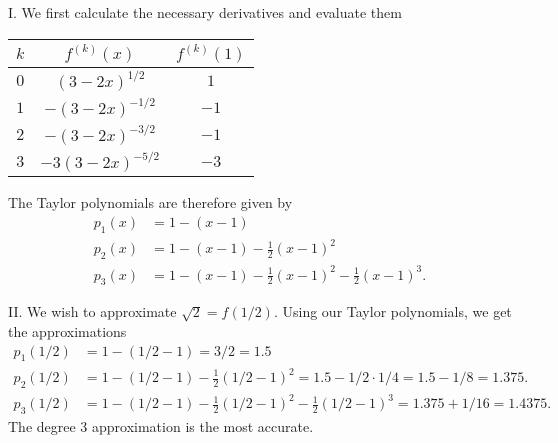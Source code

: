 \documentclass[noauthor]{ximera}
\begin{document}
\begin{freeResponse}
I. We first calculate the necessary derivatives and evaluate them
\begin{center}
\begin{tabular}{|c|c|c|}
\hline
$k$ & $f^{(k)}(x)$ & $f^{(k)}(1)$ \\
\hline
$0$ & $(3-2x)^{1/2}$ & $1$ \\
\hline
$1$ & $-(3-2x)^{-1/2}$ & $-1$ \\
\hline
$2$ & $-(3-2x)^{-3/2}$ & $-1$ \\
\hline
$3$ & $-3(3-2x)^{-5/2}$ & $-3$ \\
\hline
\end{tabular}
\end{center}
The Taylor polynomials are therefore given by
\begin{align*}
p_1(x) &= 1 - (x-1) \\
p_2(x) &= 1 - (x-1) - \frac{1}{2}(x-1)^2  \\
p_3(x) &= 1 - (x-1) - \frac{1}{2}(x-1)^2 - \frac{1}{2} (x-1)^3.
\end{align*}

II. We wish to approximate $\sqrt{2} = f(1/2)$. Using our Taylor polynomials, we get the approximations
\begin{align*}
p_1(1/2) &= 1 - (1/2-1) = 3/2 = 1.5 \\
p_2(1/2) &= 1 - (1/2-1) - \frac{1}{2}(1/2-1)^2 = 1.5 - 1/2 \cdot 1/4 = 1.5 - 1/8 = 1.375. \\
p_3(1/2) &= 1 - (1/2-1) - \frac{1}{2}(1/2-1)^2 - \frac{1}{2} (1/2-1)^3  = 1.375 + 1/16 = 1.4375.
\end{align*}
The degree 3 approximation is the most accurate.
\end{freeResponse}
\end{document}
